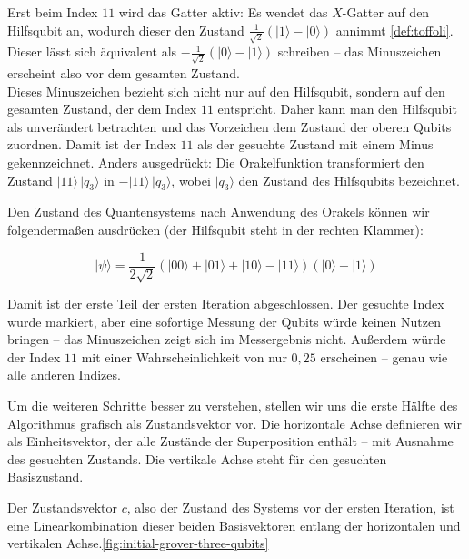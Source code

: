  Erst beim Index $11$ wird das Gatter aktiv: Es wendet das $X$-Gatter auf den Hilfsqubit an, wodurch dieser den Zustand $\frac{1}{\sqrt{2}}(|1\rangle - |0\rangle)$ annimmt \ref{def:toffoli}. Dieser lässt sich äquivalent als $-\frac{1}{\sqrt{2}}(|0\rangle - |1\rangle)$ schreiben – das Minuszeichen erscheint also vor dem gesamten Zustand.\\

 Dieses Minuszeichen bezieht sich nicht nur auf den Hilfsqubit, sondern auf den gesamten Zustand, der dem Index $11$ entspricht. Daher kann man den Hilfsqubit als unverändert betrachten und das Vorzeichen dem Zustand der oberen Qubits zuordnen. Damit ist der Index $11$ als der gesuchte Zustand mit einem Minus gekennzeichnet. Anders ausgedrückt: Die Orakelfunktion transformiert den Zustand $|11\rangle\,|q_{\text{3}}\rangle$ in $-|11\rangle\,|q_{\text{3}}\rangle$, wobei $|q_{\text{3}}\rangle$ den Zustand des Hilfsqubits bezeichnet.

Den Zustand des Quantensystems nach Anwendung des Orakels können wir folgendermaßen ausdrücken (der Hilfsqubit steht in der rechten Klammer):

$$
|\psi\rangle = \frac{1}{2\sqrt{2}} (|00\rangle + |01\rangle + |10\rangle - |11\rangle)(|0\rangle - |1\rangle)
$$

Damit ist der erste Teil der ersten Iteration abgeschlossen. Der gesuchte Index wurde markiert, aber eine sofortige Messung der Qubits würde keinen Nutzen bringen – das Minuszeichen zeigt sich im Messergebnis nicht. Außerdem würde der Index $11$ mit einer Wahrscheinlichkeit von nur $0{,}25$ erscheinen – genau wie alle anderen Indizes.

Um die weiteren Schritte besser zu verstehen, stellen wir uns die erste Hälfte des Algorithmus grafisch als Zustandsvektor vor. Die horizontale Achse definieren wir als Einheitsvektor, der alle Zustände der Superposition enthält – mit Ausnahme des gesuchten Zustands. Die vertikale Achse steht für den gesuchten Basiszustand.

Der Zustandsvektor $c$, also der Zustand des Systems vor der ersten Iteration, ist eine Linearkombination dieser beiden Basisvektoren entlang der horizontalen und vertikalen Achse.\ref{fig:initial-grover-three-qubits}

